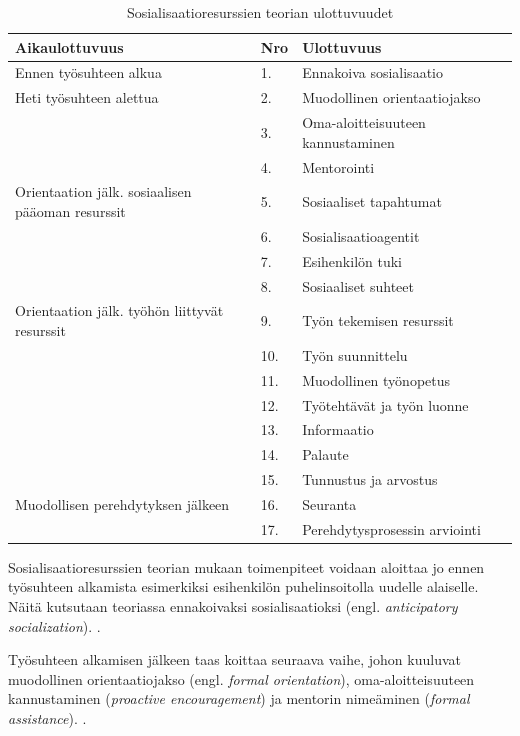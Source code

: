 \documentclass[utf8]{gradu3}
\begin{document}
\begin{table}[h]
    \footnotesize
    \begin{tabular}{llll}
        \toprule
        \textbf{Aikaulottuvuus} & \textbf{Nro} & \textbf{Ulottuvuus} \\
        \toprule
        Ennen työsuhteen alkua & 1. & Ennakoiva sosialisaatio \\
        \midrule
        Heti työsuhteen alettua & 2. & Muodollinen orientaatiojakso \\
        & 3. & Oma-aloitteisuuteen kannustaminen \\
        & 4. & Mentorointi \\
        \midrule
        Orientaation jälk. sosiaalisen pääoman resurssit & 5. & Sosiaaliset tapahtumat \\
        & 6. & Sosialisaatioagentit \\
        & 7. & Esihenkilön tuki \\
        & 8. & Sosiaaliset suhteet \\
        \midrule
        Orientaation jälk. työhön liittyvät resurssit & 9. & Työn tekemisen resurssit \\
        & 10. & Työn suunnittelu \\
        & 11. & Muodollinen työnopetus \\
        & 12. & Työtehtävät ja työn luonne \\
        & 13. & Informaatio \\
        & 14. & Palaute \\
        & 15. & Tunnustus ja arvostus \\
        \midrule
        Muodollisen perehdytyksen jälkeen & 16. & Seuranta \\
        & 17. & Perehdytysprosessin arviointi \\
        \bottomrule
    \end{tabular}
    \caption{Sosialisaatioresurssien teorian ulottuvuudet \parencite{saks-gruman-2012}}
    \label{tbl:srt-ulottuvuudet}
\end{table}

Sosialisaatioresurssien teorian mukaan toimenpiteet voidaan aloittaa jo ennen työsuhteen alkamista esimerkiksi esihenkilön puhelinsoitolla uudelle alaiselle. Näitä kutsutaan teoriassa ennakoivaksi sosialisaatioksi (engl. \textit{anticipatory socialization}). \parencite{saks-gruman-2012}.

Työsuhteen alkamisen jälkeen taas koittaa seuraava vaihe, johon kuuluvat muodollinen orientaatiojakso (engl. \textit{formal orientation}), oma-aloitteisuuteen kannustaminen (\textit{proactive encouragement}) ja mentorin nimeäminen (\textit{formal assistance}). \parencite{saks-gruman-2012}.
\end{document}
